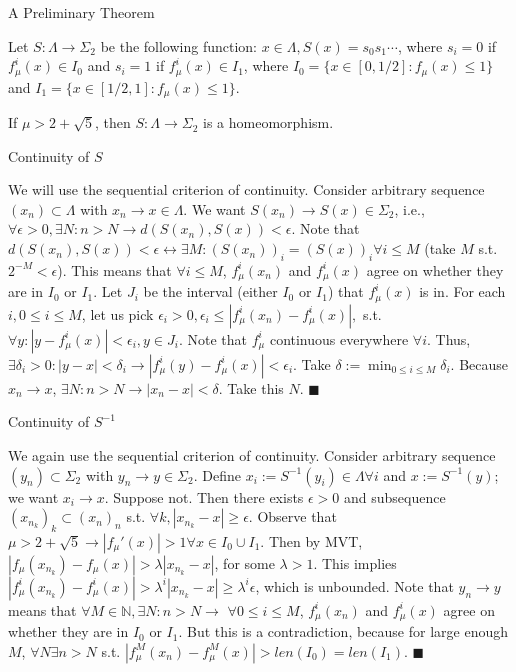 \documentclass[aspectratio=169]{beamer}
\begin{document}
\begin{frame}{A Preliminary Theorem}
\begin{defn}
    Let $S: \Lambda \rightarrow \Sigma_2$ be the following function: $x\in\Lambda, S(x)=s_0s_1\cdots$, where $s_i=0$ if $f_\mu^i(x) \in I_0$ and $s_i=1$ if $f_\mu^i(x) \in I_1$, where $I_0 = \{x \in [0,1/2] : f_\mu(x)\leq 1\}$ and $I_1 = \{x \in [1/2,1] : f_\mu(x)\leq 1\}$. 
\end{defn}
\begin{thrm}
    If $\mu>2+\sqrt5$, then $S:\Lambda \rightarrow \Sigma_2$ is a homeomorphism. 
\end{thrm}
\end{frame}

\begin{frame}{Continuity of $S$}
\begin{pf}
    We will use the sequential criterion of continuity. Consider arbitrary sequence $(x_n) \subset \Lambda$ with $x_n \rightarrow x \in \Lambda$. We want $S(x_n) \rightarrow S(x) \in \Sigma_2$, i.e., $\forall \epsilon>0, \exists N: n>N \rightarrow d(S(x_n),S(x)) < \epsilon$. Note that $d(S(x_n),S(x)) < \epsilon \leftrightarrow \exists M : (S(x_n))_i = (S(x))_i \forall i\leq M$ (take $M$ s.t. $2^{-M} < \epsilon$). This means that $\forall i \leq M$, $f_\mu^i(x_n)$ and $f_\mu^i(x)$ agree on whether they are in $I_0$ or $I_1$. 
    Let $J_i$ be the interval (either $I_0$ or $I_1$) that $f_\mu^i(x)$ is in. For each $i, 0\leq i \leq M$, let us pick $\epsilon_i>0, \epsilon_i \leq |f_\mu^i(x_n)-f_\mu^i(x)|,$ s.t. $\forall y: |y-f_\mu^i(x)| < \epsilon_i,y \in J_i$. Note that $f_\mu^i$ continuous everywhere $\forall i$. Thus, $\exists \delta_i>0 : |y-x| < \delta_i \rightarrow |f_\mu^i(y)-f_\mu^i(x)| < \epsilon_i$. Take $\delta := \displaystyle\min_{0\leq i\leq M} \delta_i$. Because $x_n \rightarrow x$, $\exists N: n>N \rightarrow |x_n-x| < \delta$. Take this $N$. $\blacksquare$ 
\end{pf}
\end{frame}

\begin{frame}{Continuity of $S^{-1}$}
\begin{pf}
    We again use the sequential criterion of continuity. Consider arbitrary sequence $(y_n) \subset \Sigma_2$ with $y_n \rightarrow y \in \Sigma_2$. Define $x_i := S^{-1}(y_i) \in \Lambda \forall i$ and $x := S^{-1}(y)$; we want $x_i \rightarrow x$. Suppose not. Then there exists $\epsilon>0$ and subsequence $(x_{n_k})_k \subset (x_n)_n$ s.t. $\forall k, |x_{n_k}-x|\geq \epsilon$. Observe that $\mu>2+\sqrt5 \rightarrow |f_\mu'(x)|>1 \forall x \in I_0 \cup I_1$. Then by MVT, $|f_\mu(x_{n_k})-f_\mu(x)| > \lambda|x_{n_k}-x|$, for some $\lambda>1$. This implies $|f_\mu^i(x_{n_k})-f_\mu^i(x)| > \lambda^i|x_{n_k}-x| \geq \lambda^i\epsilon$, which is unbounded. Note that $y_n \rightarrow y$ means that $\forall M\in \mathbb{N}, \exists N: n>N \rightarrow$  $\forall 0\leq i \leq M$, $f_\mu^i(x_n)$ and $f_\mu^i(x)$ agree on whether they are in $I_0$ or $I_1$. But this is a contradiction, because for large enough $M$, $\forall N\exists n>N$ s.t. $|f_\mu^M(x_n)-f_\mu^M(x)| > len(I_0) = len(I_1)$. $\blacksquare$ 
\end{pf}
\end{frame}
\end{document}
